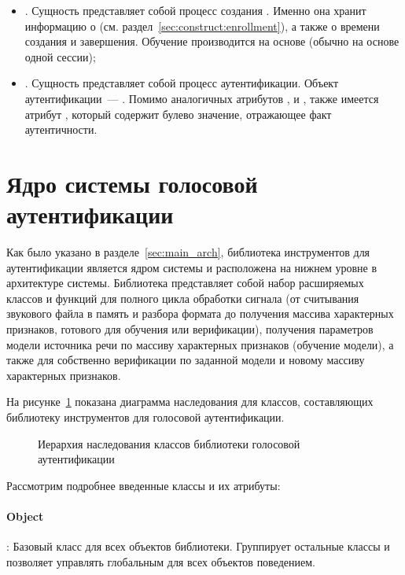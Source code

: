 \begin{itemize}
\item {}. Сущность представляет собой процесс создания . Именно она хранит информацию о  (см. раздел~\ref{sec:construct:enrollment}), а также о времени создания и завершения. Обучение производится на основе  (обычно на основе одной сессии);
\item {}. Сущность представляет собой процесс аутентификации. Объект аутентификации~--- . Помимо аналогичных атрибутов ,  и , также имеется атрибут , который содержит булево значение, отражающее факт аутентичности.
\end{itemize}


\section{Ядро системы голосовой аутентификации}

Как было указано в разделе~\ref{sec:main_arch}, библиотека инструментов для аутентификации является ядром системы и расположена на нижнем уровне в архитектуре системы. Библиотека представляет собой набор расширяемых классов и функций для полного цикла обработки сигнала (от считывания звукового файла в память и разбора формата до получения массива характерных признаков, готового для обучения или верификации), получения параметров модели источника речи по массиву характерных признаков (обучение модели), а также для собственно верификации по заданной модели и новому массиву характерных признаков.

На рисунке~\ref{fig:inheritance_verispeak} показана диаграмма наследования для классов, составляющих библиотеку инструментов для голосовой аутентификации.

\begin{figure}[ht]
\center{\scalebox{1.0}{}}
\label{fig:inheritance_verispeak}
\caption{Иерархия наследования классов библиотеки голосовой аутентификации}
\end{figure}

Рассмотрим подробнее введенные классы и их атрибуты:

\paragraph{Object}: Базовый класс для всех объектов библиотеки. Группирует остальные классы и позволяет управлять глобальным для всех объектов поведением.


